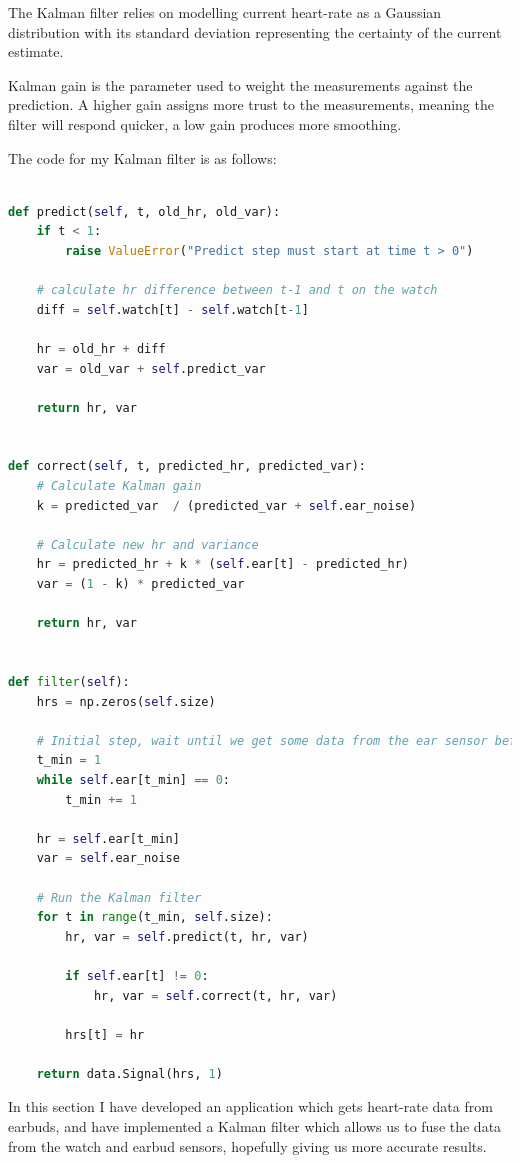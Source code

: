 \documentclass[12pt,a4paper,twoside,openany]{report}
\begin{document}
The Kalman filter relies on modelling current heart-rate as a Gaussian
distribution with its standard deviation representing the certainty of the
current estimate.

Kalman gain is the parameter used to weight the measurements against the
prediction. A higher gain assigns more trust to the measurements, meaning the
filter will respond quicker, a low gain produces more smoothing.

The code for my Kalman filter is as follows:


\begin{lstlisting}[language=Python]

def predict(self, t, old_hr, old_var):
    if t < 1:
        raise ValueError("Predict step must start at time t > 0")

    # calculate hr difference between t-1 and t on the watch
    diff = self.watch[t] - self.watch[t-1]

    hr = old_hr + diff
    var = old_var + self.predict_var

    return hr, var


def correct(self, t, predicted_hr, predicted_var):
    # Calculate Kalman gain
    k = predicted_var  / (predicted_var + self.ear_noise)

    # Calculate new hr and variance
    hr = predicted_hr + k * (self.ear[t] - predicted_hr)
    var = (1 - k) * predicted_var

    return hr, var


def filter(self):
    hrs = np.zeros(self.size)

    # Initial step, wait until we get some data from the ear sensor before starting the filter
    t_min = 1
    while self.ear[t_min] == 0:
        t_min += 1

    hr = self.ear[t_min]
    var = self.ear_noise

    # Run the Kalman filter
    for t in range(t_min, self.size):
        hr, var = self.predict(t, hr, var)

        if self.ear[t] != 0:
            hr, var = self.correct(t, hr, var)

        hrs[t] = hr

    return data.Signal(hrs, 1)

\end{lstlisting}

In this section I have developed an application which gets heart-rate data from
earbuds, and have implemented a Kalman filter which allows us to fuse the data
from the watch and earbud sensors, hopefully giving us more accurate results.
\end{document}
